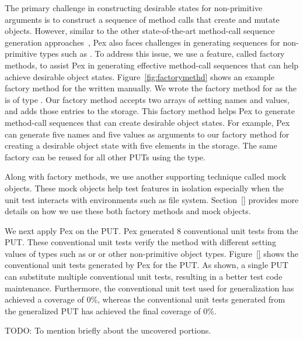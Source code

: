 The primary challenge in constructing desirable states for non-primitive arguments is to construct a sequence of method calls that create and mutate objects. However, similar to the other state-of-the-art method-call sequence generation approaches~\cite{}, Pex also faces challenges in generating sequences for non-primitive types such as . To address this issue, we use a feature, called factory methods, to assist Pex in generating effective method-call sequences that can help achieve desirable object states. Figure~\ref{fig:factorymethd} shows an example factory method for the  written manually. We wrote the factory method for  as the  is of type . Our factory method accepts two arrays of setting names and values, and adds those entries to the storage. This factory method helps Pex to generate method-call sequences that can create desirable object states. For example, Pex can generate five names and five values as arguments to our factory method for creating a desirable object state with five elements in the storage. The same factory can be reused for all other PUTs using the  type.

Along with factory methods, we use another supporting technique called mock objects. These mock objects help test features in isolation especially when the unit test interacts with environments such as file system. Section~\ref{} provides more details on how we use these both factory methods and mock objects.


We next apply Pex on the  PUT. Pex generated $8$ conventional unit tests from the  PUT. These conventional unit tests verify the  method with different setting values of types such as  or  or other non-primitive object types. Figure~\ref{} shows the conventional unit tests generated by Pex for the PUT. As shown, a single PUT can substitute multiple conventional unit tests, resulting in a better test code maintenance. Furthermore, the conventional unit test used for generalization has achieved a coverage of $0$\%, whereas the conventional unit tests generated from the generalized PUT has achieved the final coverage of $0$\%. 

TODO: To mention briefly about the uncovered portions.

